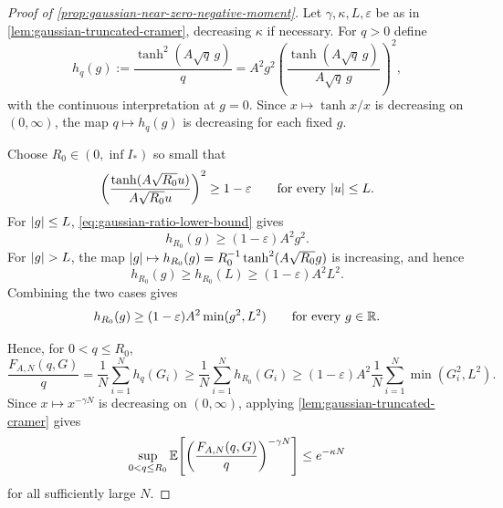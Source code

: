\documentclass[11pt,reqno,a4paper]{article}
\newcommand{\Ee}{\E}
\begin{document}
\begin{proof}[Proof of \cref{prop:gaussian-near-zero-negative-moment}]
  Let $\gamma,\kappa,L,\varepsilon$ be as in
  \cref{lem:gaussian-truncated-cramer}, decreasing $\kappa$ if necessary.
  For $q>0$ define
  \begin{equation*}
    h_q(g)
    :=
    \frac{\tanh^2(A\sqrt q\,g)}{q}
    =
    A^2g^2
    \left(
      \frac{\tanh(A\sqrt q\,g)}{A\sqrt q\,g}
    \right)^2,
  \end{equation*}
  with the continuous interpretation at $g=0$. Since
  $x\mapsto \tanh x/x$ is decreasing on $(0,\infty)$, the map
  $q\mapsto h_q(g)$ is decreasing for each fixed $g$.

  Choose $R_0\in(0,\inf I_\ast)$ so small that
  \begin{equation}\label{eq:gaussian-ratio-lower-bound}
    \left(
      \frac{\tanh(A\sqrt{R_0}u)}{A\sqrt{R_0}u}
    \right)^2
    \geq
    1-\varepsilon
    \qquad \mbox{for every }\abs u\leq L.
  \end{equation}
  For $\abs g\leq L$, \cref{eq:gaussian-ratio-lower-bound} gives
  \begin{equation*}
    h_{R_0}(g)\geq(1-\varepsilon)A^2g^2.
  \end{equation*}
  For $\abs g>L$, the map
  $\abs g\mapsto h_{R_0}(g)=R_0^{-1}\tanh^2(A\sqrt{R_0}g)$ is increasing, and
  hence
  \begin{equation*}
    h_{R_0}(g)
    \geq
    h_{R_0}(L)
    \geq
    (1-\varepsilon)A^2L^2.
  \end{equation*}
  Combining the two cases gives
  \begin{equation}\label{eq:gaussian-h-lower-truncated}
    h_{R_0}(g)
    \geq
    (1-\varepsilon)A^2\min(g^2,L^2)
    \qquad \mbox{for every }g\in\mathbb{R}.
  \end{equation}

  Hence, for $0<q\leq R_0$,
  \begin{equation*}
    \frac{F_{A,N}(q,G)}{q}
    =
    \frac1N\sum_{i=1}^N h_q(G_i)
    \geq
    \frac1N\sum_{i=1}^N h_{R_0}(G_i)
    \geq
    (1-\varepsilon)A^2
    \frac1N\sum_{i=1}^N\min(G_i^2,L^2).
  \end{equation*}
  Since $x\mapsto x^{-\gamma N}$ is decreasing on $(0,\infty)$, applying
  \cref{lem:gaussian-truncated-cramer} gives
  \begin{equation*}
    \sup_{0<q\leq R_0}
    \Ee\left[
      \left(
        \frac{F_{A,N}(q,G)}{q}
      \right)^{-\gamma N}
    \right]
    \leq
    e^{-\kappa N}
  \end{equation*}
  for all sufficiently large $N$.
\end{proof}
\end{document}
